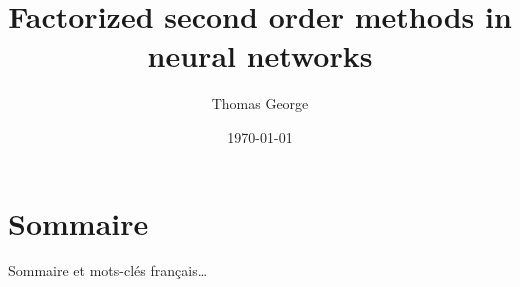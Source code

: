\documentclass[12pt,maitrise,nobabel,anglais,twoside,initial]{template/dms}
\numberwithin{equation}{section}
\numberwithin{table}{chapter}
\numberwithin{figure}{chapter}
\begin{document}


\title{Factorized second order methods in neural networks}
\author{Thomas George}
\date{\today}									%




\maketitle    
 
\chapter*{Sommaire} 	%

\noindent Sommaire et mots-clés français\dots	%
\end{document}
